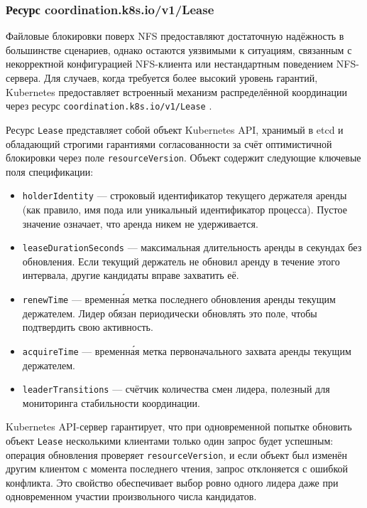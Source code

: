 \subsubsection*{Ресурс coordination.k8s.io/v1/Lease}

Файловые блокировки поверх NFS предоставляют достаточную надёжность в большинстве сценариев, однако остаются уязвимыми к ситуациям, связанным с некорректной конфигурацией NFS-клиента или нестандартным поведением NFS-сервера. Для случаев, когда требуется более высокий уровень гарантий, Kubernetes предоставляет встроенный механизм распределённой координации через ресурс \texttt{coordination.k8s.io/v1/Lease} \cite{k8s_lease_api}.

Ресурс \texttt{Lease} представляет собой объект Kubernetes API, хранимый в etcd и обладающий строгими гарантиями согласованности за счёт оптимистичной блокировки через поле \texttt{resourceVersion}. Объект содержит следующие ключевые поля спецификации:
\begin{itemize}[leftmargin=*]
  \item \texttt{holderIdentity} --- строковый идентификатор текущего держателя аренды (как правило, имя пода или уникальный идентификатор процесса). Пустое значение означает, что аренда никем не удерживается.
  \item \texttt{leaseDurationSeconds} --- максимальная длительность аренды в секундах без обновления. Если текущий держатель не обновил аренду в течение этого интервала, другие кандидаты вправе захватить её.
  \item \texttt{renewTime} --- временна́я метка последнего обновления аренды текущим держателем. Лидер обязан периодически обновлять это поле, чтобы подтвердить свою активность.
  \item \texttt{acquireTime} --- временна́я метка первоначального захвата аренды текущим держателем.
  \item \texttt{leaderTransitions} --- счётчик количества смен лидера, полезный для мониторинга стабильности координации.
\end{itemize}

Kubernetes API-сервер гарантирует, что при одновременной попытке обновить объект \texttt{Lease} несколькими клиентами только один запрос будет успешным: операция обновления проверяет \texttt{resourceVersion}, и если объект был изменён другим клиентом с момента последнего чтения, запрос отклоняется с ошибкой конфликта. Это свойство обеспечивает выбор ровно одного лидера даже при одновременном участии произвольного числа кандидатов.

